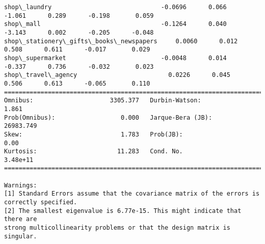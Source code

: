 \documentclass[11pt]{article}
\begin{document}
\begin{Verbatim}[commandchars=\\\{\}]
shop\_laundry                              -0.0696      0.066     -1.061      0.289      -0.198       0.059
shop\_mall                                 -0.1264      0.040     -3.143      0.002      -0.205      -0.048
shop\_stationery\_gifts\_books\_newspapers     0.0060      0.012      0.508      0.611      -0.017       0.029
shop\_supermarket                          -0.0048      0.014     -0.337      0.736      -0.032       0.023
shop\_travel\_agency                         0.0226      0.045      0.506      0.613      -0.065       0.110
==============================================================================
Omnibus:                     3305.377   Durbin-Watson:                   1.861
Prob(Omnibus):                  0.000   Jarque-Bera (JB):            26983.749
Skew:                           1.783   Prob(JB):                         0.00
Kurtosis:                      11.283   Cond. No.                     3.48e+11
==============================================================================

Warnings:
[1] Standard Errors assume that the covariance matrix of the errors is correctly specified.
[2] The smallest eigenvalue is 6.77e-15. This might indicate that there are
strong multicollinearity problems or that the design matrix is singular.

    \end{Verbatim}
\end{document}
